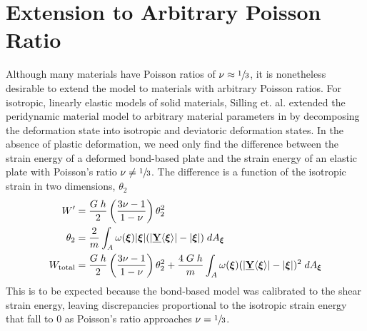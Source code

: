 \documentclass[preprint,review,12pt]{elsarticle}
\newcommand\vstate[3]{%
	\mathbf{\underline{#1}}%
	\ifstrempty{#2}{}{[#2]}%
	\ifstrempty{#3}{}{\langle #3 \rangle}}
\begin{document}
\section{Extension to Arbitrary Poisson Ratio}
Although many materials have Poisson ratios of \(\nu\approx \sfrac{1}{3}\), it is nonetheless desirable to extend the model to materials with arbitrary Poisson ratios.
For isotropic, linearly elastic models of solid materials, Silling et. al. extended the peridynamic material model to arbitrary material parameters in \cite{silling2007peridynamic} by decomposing the deformation state into isotropic and deviatoric deformation states.
In the absence of plastic deformation, we need only find the difference between the strain energy of a deformed bond-based plate and the strain energy of an elastic plate with Poisson's ratio \(\nu \neq \sfrac{1}{3}\).
The difference is a function of the isotropic strain in two dimensions, \(\theta_2\)
%
\begin{align}
    W' &= \frac{G\;h}{2}\left(\frac{3\nu-1}{1-\nu}\right)\theta_2^2 \notag \\
    \theta_2 &= \frac{2}{m}\int_A \omega(\boldsymbol{\xi})|\boldsymbol{\xi}|(|\vstate{Y}{}{\boldsymbol{\xi}}|-|\boldsymbol{\xi}|)\;dA_{\boldsymbol{\xi}} \notag \\
    W_\text{total} &= \frac{G\;h}{2}\left(\frac{3\nu-1}{1-\nu}\right)\theta_2^2 + \frac{4\;G\;h}{m}\int_A \omega(\boldsymbol{\xi})(|\vstate{Y}{}{\boldsymbol{\xi}}|-|\boldsymbol{\xi}|)^2\;dA_{\boldsymbol{\xi}}\notag
\end{align}
%
This is to be expected because the bond-based model was calibrated to the shear strain energy, leaving discrepancies proportional to the isotropic strain energy that fall to 0 as Poisson's ratio approaches \(\nu = \sfrac{1}{3}\).
\end{document}
